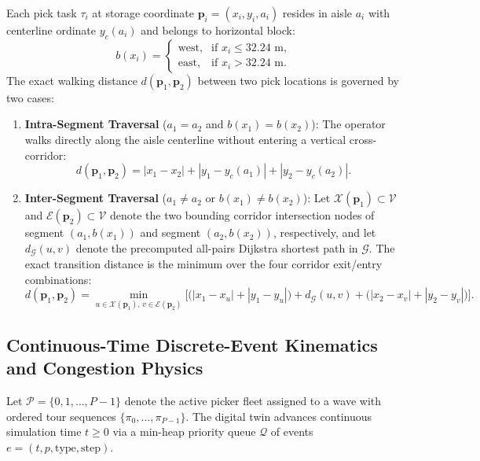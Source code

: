 \documentclass[11pt,a4paper]{article}
\begin{document}
Each pick task $\tau_i$ at storage coordinate $\mathbf{p}_i = (x_i, y_i, a_i)$ resides in aisle $a_i$ with centerline ordinate $y_c(a_i)$ and belongs to horizontal block:
\begin{equation}
    b(x_i) = \begin{cases}
        \text{west}, & \text{if } x_i \le 32.24\text{ m}, \\
        \text{east}, & \text{if } x_i > 32.24\text{ m}.
    \end{cases}
\end{equation}
The exact walking distance $d(\mathbf{p}_1, \mathbf{p}_2)$ between two pick locations is governed by two cases:
\begin{enumerate}[leftmargin=*]
    \item \textbf{Intra-Segment Traversal} ($a_1 = a_2$ and $b(x_1) = b(x_2)$): The operator walks directly along the aisle centerline without entering a vertical cross-corridor:
    \begin{equation}
        d(\mathbf{p}_1, \mathbf{p}_2) = |x_1 - x_2| + |y_1 - y_c(a_1)| + |y_2 - y_c(a_2)|.
    \end{equation}
    \item \textbf{Inter-Segment Traversal} ($a_1 \neq a_2$ or $b(x_1) \neq b(x_2)$): Let $\mathcal{X}(\mathbf{p}_1) \subset \mathcal{V}$ and $\mathcal{E}(\mathbf{p}_2) \subset \mathcal{V}$ denote the two bounding corridor intersection nodes of segment $(a_1, b(x_1))$ and segment $(a_2, b(x_2))$, respectively, and let $d_{\mathcal{G}}(u, v)$ denote the precomputed all-pairs Dijkstra shortest path in $\mathcal{G}$. The exact transition distance is the minimum over the four corridor exit/entry combinations:
    \begin{equation}
        d(\mathbf{p}_1, \mathbf{p}_2) = \min_{u \in \mathcal{X}(\mathbf{p}_1), \, v \in \mathcal{E}(\mathbf{p}_2)} \Big[ \big(|x_1 - x_u| + |y_1 - y_u|\big) + d_{\mathcal{G}}(u, v) + \big(|x_2 - x_v| + |y_2 - y_v|\big) \Big].
    \end{equation}
\end{enumerate}

\subsection{Continuous-Time Discrete-Event Kinematics and Congestion Physics}
Let $\mathcal{P} = \{0, 1, \dots, P-1\}$ denote the active picker fleet assigned to a wave with ordered tour sequences $\{\pi_0, \dots, \pi_{P-1}\}$. The digital twin advances continuous simulation time $t \ge 0$ via a min-heap priority queue $\mathcal{Q}$ of events $e = (t, p, \text{type}, \text{step})$.
\end{document}
